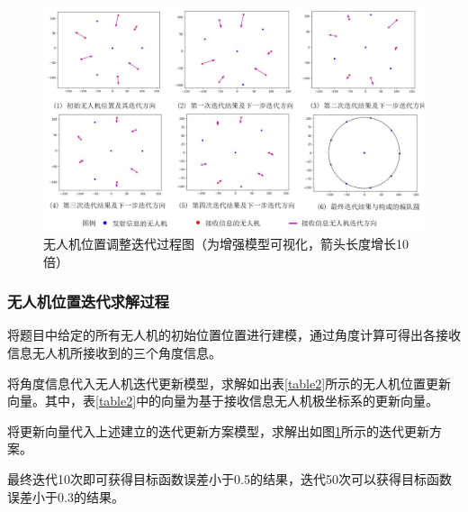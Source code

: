 \documentclass{my_paper}
\begin{document}
\begin{figure}[h]
    \centering
    \includegraphics[width=1\textwidth]{images/diedai.jpg}
    \caption{无人机位置调整迭代过程图（为增强模型可视化，箭头长度增长10倍）}
    \label{diedai}
\end{figure}


\subsubsection{无人机位置迭代求解过程}
将题目中给定的所有无人机的初始位置位置进行建模，通过角度计算可得出各接收信息无人机所接收到的三个角度信息。

将角度信息代入无人机迭代更新模型，求解如出表\ref{table2}所示的无人机位置更新向量。其中，表\ref{table2}中的向量为基于接收信息无人机极坐标系的更新向量。

将更新向量代入上述建立的迭代更新方案模型，求解出如图\ref{diedai}所示的迭代更新方案。

最终迭代10次即可获得目标函数误差小于0.5的结果，迭代50次可以获得目标函数误差小于0.3的结果。
\end{document}
